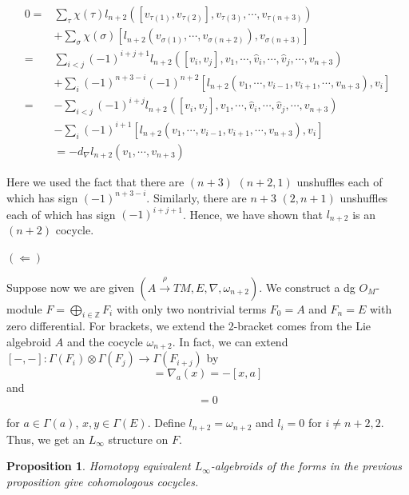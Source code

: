 \documentclass[12pt]{amsart}
\newtheorem{prop}[thm]{Proposition}
\theoremstyle{definition}
\theoremstyle{remark}
\numberwithin{equation}{section}
\newcommand{\Z}{{\mathbb{Z}}}
\newcommand{\1}{{\mathbb{1}}}
\begin{document}
\begin{align*}
0=& \sum_{\tau} \chi (\tau)l_{n+2}([v_{\tau(1)}, v_{\tau(2)}],v_{\tau(3)}, \cdots, v_{\tau(n+3)} )\\
&+\sum_{\sigma} \chi(\sigma) [l_{n+2}(v_{\sigma(1)},\cdots,v_{\sigma(n+2) } ), v_{\sigma(n+3)} ]\\
=& \sum_{i<j} (-1)^{i+j+1}l_{n+2}([v_{i}, v_{j}],v_{1}, \cdots, \hat{v}_i, \cdots, \hat{v}_j, \cdots, v_{n+3} )\\
&+\sum_{i} (-1)^{n+3-i}(-1)^{n+2} [l_{n+2}(v_{1},\cdots,v_{i-1}, v_{i+1},\cdots, v_{n+3}), v_{i} ]\\
=& -\sum_{i<j} (-1)^{i+j}l_{n+2}([v_{i}, v_{j}],v_{1}, \cdots, \hat{v}_i, \cdots, \hat{v}_j, \cdots, v_{n+3} )\\
&-\sum_{i} (-1)^{i+1} [l_{n+2}(v_{1},\cdots,v_{i-1}, v_{i+1},\cdots, v_{n+3}), v_{i} ]\\
&=-d_{\nabla}l_{n+2}(v_1,\cdots,v_{n+3})
\end{align*}

Here we used the fact that there are $(n+3)$ $(n+2,1)$ unshuffles each of which has sign $(-1)^{n+3-i}$. Similarly, there are $n+3$ $(2,n+1)$ unshuffles each of which has sign $(-1)^{i+j+1}$. Hence, we have shown that $l_{n+2}$ is an $(n+2)$ cocycle.

$(\Leftarrow)$

Suppose now we are given $(A\stackrel{\rho}{\to} TM,E, \nabla, \omega_{n+2})$. We construct a dg $O_M$-module $F=\bigoplus_{i\in \Z}F_i$ with only two nontrivial terms $F_0=A$ and $F_n=E$ with zero differential. For brackets, we extend the 2-bracket comes from the Lie algebroid $A$ and the cocycle $\omega_{n+2}$. In fact, we can extend $[-,-]: \Gamma(F_i)\otimes \Gamma(F_j)\to \Gamma(F_{i+j})$ by
\begin{equation*}
[a,x]=\nabla_a(x)=-[x,a]
\end{equation*}
and 
\begin{equation*}
[x,y]=0
\end{equation*}

for $a\in \Gamma(a)$, $x,y\in \Gamma(E)$. Define $l_{n+2}=\omega_{n+2}$ and $l_i=0$ for $i\not=n+2, 2$. Thus, we get an $L_{\infty}$ structure on $F$.

\begin{prop}
	Homotopy equivalent $L_{\infty}$-algebroids of the forms in the previous proposition give cohomologous cocycles. 
\end{prop}
\end{document}
